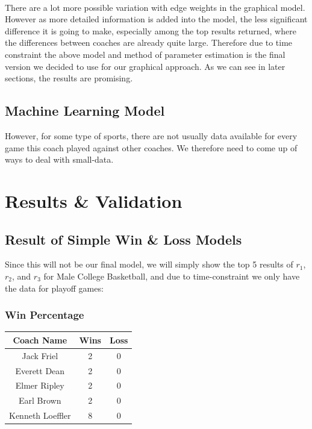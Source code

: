 \documentclass[titlepage]{article}
\begin{document}
\noindent 
\\

\noindent There are a lot more possible variation with edge weights in the graphical model. However as more detailed information is added into the model, the less significant difference it is going to make, especially among the top results returned, where the differences between coaches are already quite large. Therefore due to time constraint the above model and method of parameter estimation is the final version we decided to use for our graphical approach. As we can see in later sections, the results are promising.

\subsection{Machine Learning Model}

However, for some type of sports, there are not usually data available for every game this coach played against other coaches. We therefore need to come up of ways to deal with small-data.

\section{Results \& Validation}

\subsection{Result of Simple Win \& Loss Models}

Since this will not be our final model, we will simply show the top 5 results of $r_1$, $r_2$, and $r_3$ for Male College Basketball, and due to time-constraint we only have the data for playoff games:

\subsubsection*{Win Percentage}

\begin{center}
\begin{tabular}{ | c | c | c| }
\hline
Coach Name       & Wins  & Loss \\\hline
Jack Friel       & 2     & 0 \\\hline
Everett Dean     & 2     & 0 \\\hline
Elmer Ripley     & 2     & 0 \\\hline
Earl Brown       & 2     & 0 \\\hline
Kenneth Loeffler & 8     & 0 \\
\hline
\end{tabular}
\end{center}
\end{document}

